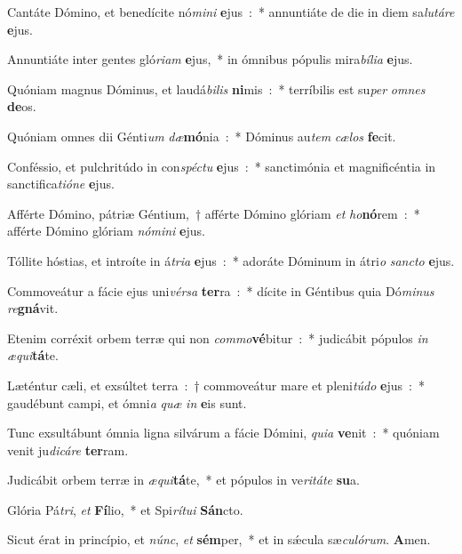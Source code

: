 \item Cantáte Dómino, et benedícite nó\emph{mi}\emph{ni} \textbf{e}jus~:~* annuntiáte de die in diem sa\emph{lu}\emph{tá}\emph{re} \textbf{e}jus.
\item Annuntiáte inter gentes gló\emph{ri}\emph{am} \textbf{e}jus,~* in ómnibus pópulis mira\emph{bí}\emph{li}\emph{a} \textbf{e}jus.
\item Quóniam magnus Dóminus, et laudá\emph{bi}\emph{lis} \textbf{ni}mis~:~* terríbilis est su\emph{per} \emph{om}\emph{nes} \textbf{de}os.
\item Quóniam omnes dii Génti\emph{um} \emph{dæ}\textbf{mó}nia~:~* Dóminus au\emph{tem} \emph{cæ}\emph{los} \textbf{fe}cit.
\item Conféssio, et pulchritúdo in con\emph{spé}\emph{ctu} \textbf{e}jus~:~* sanctimónia et magnificéntia in sanctifica\emph{ti}\emph{ó}\emph{ne} \textbf{e}jus.
\item Afférte Dómino, pátriæ Géntium,~† afférte Dómino glóriam \emph{et} \emph{ho}\textbf{nó}rem~:~* afférte Dómino glóriam \emph{nó}\emph{mi}\emph{ni} \textbf{e}jus.
\item Tóllite hóstias, et introíte in á\emph{tri}\emph{a} \textbf{e}jus~:~* adoráte Dóminum in átri\emph{o} \emph{san}\emph{cto} \textbf{e}jus.
\item Commoveátur a fácie ejus uni\emph{vér}\emph{sa} \textbf{ter}ra~:~* dícite in Géntibus quia Dó\emph{mi}\emph{nus} \emph{re}\textbf{gná}vit.
\item Etenim corréxit orbem terræ qui non \emph{com}\emph{mo}\textbf{vé}bitur~:~* judicábit pópulos \emph{in} \emph{æ}\emph{qui}\textbf{tá}te.
\item Læténtur cæli, et exsúltet terra~:~† commoveátur mare et pleni\emph{tú}\emph{do} \textbf{e}jus~:~* gaudébunt campi, et ómni\emph{a} \emph{quæ} \emph{in} \textbf{e}is sunt.
\item Tunc exsultábunt ómnia ligna silvárum a fácie Dómini, \emph{qui}\emph{a} \textbf{ve}nit~:~* quóniam venit ju\emph{di}\emph{cá}\emph{re} \textbf{ter}ram.
\item Judicábit orbem terræ in \emph{æ}\emph{qui}\textbf{tá}te,~* et pópulos in ve\emph{ri}\emph{tá}\emph{te} \textbf{su}a.
\item Glória Pá\emph{tri}, \emph{et} \textbf{Fí}lio,~* et Spi\emph{rí}\emph{tu}\emph{i} \textbf{Sán}cto.
\item Sicut érat in princípio, et \emph{núnc}, \emph{et} \textbf{sém}per,~* et in sǽcula sæ\emph{cu}\emph{ló}\emph{rum}. \textbf{A}men.